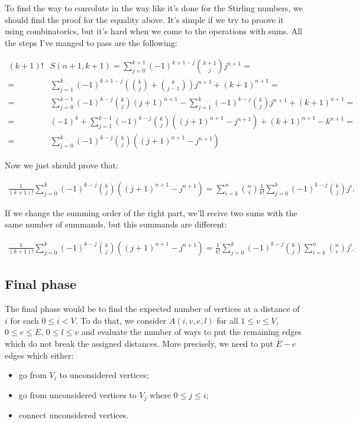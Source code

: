 \documentclass{llncs}
\begin{document}
  To find the way to convolute in the way like it's done for the Stirling numbers, we should find the proof for the equality above. It's simple if we try to proove it using combinatorics, but it's hard when we come to the operations with sums. All the steps I've manged to pass are the following:
  
  \begin{align*}
  (k + 1)! & S(n + 1, k + 1) =  \sum_{j = 0}^{k + 1} (-1) ^{k + 1 - j} \binom{k + 1}{j} j^{n + 1} = \\
  = &  \sum_{j = 1}^{k} (-1) ^{k + 1 - j} \left(\binom{k}{j} + \binom{k}{j - 1}\right) j^{n + 1}  + (k + 1)^{n + 1} = \\
  = & \sum_{j = 0}^{k - 1}(-1)^{k - j} \binom{k}{j} (j + 1)^{n + 1} - \sum_{j = 1}^{k}(-1)^{k - j} \binom{k}{j} j^{n + 1} + (k + 1)^{n + 1} = \\
  = &  (-1)^k + \sum_{j = 1}^{k - 1}(-1)^{k - j} \binom{k}{j} ((j + 1)^{n + 1} - j^{n + 1}) + (k + 1)^{n + 1} - k^{n + 1} = \\
  = & \sum_{j = 0}^{k}(-1)^{k - j} \binom{k}{j} ((j + 1)^{n + 1} - j^{n + 1})
  \end{align*}
  
  Now we just should prove that:
  
  \begin{align*}
  \frac{1}{(k + 1)!} \sum_{j = 0}^{k}(-1)^{k - j} \binom{k}{j} ((j + 1)^{n + 1} - j^{n + 1}) = \sum_{i = k}^{n} \binom{n}{i} \frac{1}{k!} \sum_{j = 0}^{k} (-1)^{k-j} \binom{k}{j} j^i.
  \end{align*}
  
  If we change the summing order of the right part, we'll recive two sums with the same number of summands, but this summands are different:
  
  \begin{align*}
  \frac{1}{(k + 1)!} \sum_{j = 0}^{k}(-1)^{k - j} \binom{k}{j} ((j + 1)^{n + 1} - j^{n + 1}) =  \frac{1}{k!} \sum_{j = 0}^{k} (-1)^{k-j} \binom{k}{j}  \sum_{i = k}^{n} \binom{n}{i} j^i.
  \end{align*}
    
  
  \subsection{Final phase}
  
  The final phase would be to find the expected number of vertices at a distance of $i$ for each $0 \le i < V$.
  To do that, we consider $A(i, v, e, l)$ for all $1 \le v \le V$, $0 \le e \le E$, $0 \le l \le v$
  and evaluate the number of ways to put the remaining edges which do not break the assigned distances.
  More precisely, we need to put $E - e$ edges which either:
  \begin{itemize}
  \item go from $V_i$ to unconsidered vertices;
  \item go from unconsidered vertices to $V_j$ where $0 \le j \le i$;
  \item connect unconsidered vertices.
  \end{itemize}
  
\end{document}
